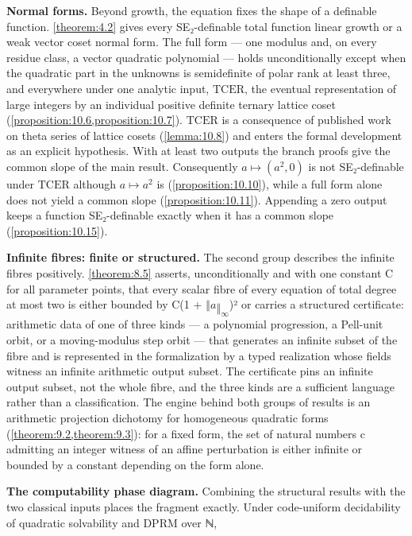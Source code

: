 \textbf{Normal forms.} Beyond growth, the equation fixes the shape of a definable function. \cref{theorem:4.2} gives every SE₂-definable total function linear growth or a weak vector coset normal form. The full form --- one modulus and, on every residue class, a vector quadratic polynomial --- holds unconditionally except when the quadratic part in the unknowns is semidefinite of polar rank at least three, and everywhere under one analytic input, $\mathrm{TCER}$, the eventual representation of large integers by an individual positive definite ternary lattice coset (\cref{proposition:10.6,proposition:10.7}). $\mathrm{TCER}$ is a consequence of published work on theta series of lattice cosets (\cref{lemma:10.8}) and enters the formal development as an explicit hypothesis. With at least two outputs the branch proofs give the common slope of the main result. Consequently $a ↦ (a^{2}, 0)$ is not SE₂-definable under $\mathrm{TCER}$ although $a ↦ a^{2}$ is (\cref{proposition:10.10}), while a full form alone does not yield a common slope (\cref{proposition:10.11}). Appending a zero output keeps a function SE₂-definable exactly when it has a common slope (\cref{proposition:10.15}).

\textbf{Infinite fibres: finite or structured.} The second group describes the infinite fibres positively. \cref{theorem:8.5} asserts, unconditionally and with one constant C for all parameter points, that every scalar fibre of every equation of total degree at most two is either bounded by C(1 + $‖a‖_{∞}$)² or carries a structured certificate: arithmetic data of one of three kinds — a polynomial progression, a Pell-unit orbit, or a moving-modulus step orbit — that generates an infinite subset of the fibre and is represented in the formalization by a typed realization whose fields witness an infinite arithmetic output subset. The certificate pins an infinite output subset, not the whole fibre, and the three kinds are a sufficient language rather than a classification. The engine behind both groups of results is an arithmetic projection dichotomy for homogeneous quadratic forms (\cref{theorem:9.2,theorem:9.3}): for a fixed form, the set of natural numbers c admitting an integer witness of an affine perturbation is either infinite or bounded by a constant depending on the form alone.

\textbf{The computability phase diagram.} Combining the structural results with the two classical inputs places the fragment exactly. Under code-uniform decidability of quadratic solvability and DPRM over ℕ,

